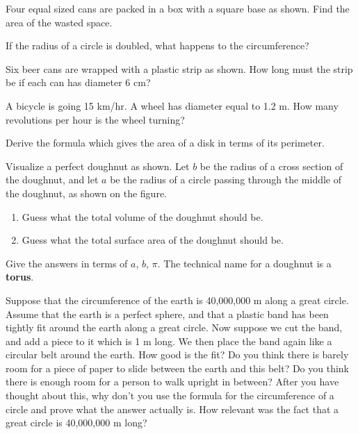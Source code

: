 \documentclass[12pt]{book} %
\begin{document}
\setcounter{Exercise}{7}
\begin{ExerciseList}
\Exercise Four equal sized cans are packed in a box with a square base as shown. Find the area of the wasted space.


\Exercise If the radius of a circle is doubled, what happens to the circumference?

\Exercise Six beer cans are wrapped with a plastic strip as shown. How long must the strip be if each can has diameter 6 cm?


\Exercise A bicycle is going 15 km/hr. A wheel has diameter equal to 1.2 m. How many revolutions per hour is the wheel turning?

\Exercise Derive the formula which gives the area of a disk in terms of its perimeter.

\Exercise Visualize a perfect doughnut as shown. Let $b$ be the radius of a cross section of the doughnut, and let $a$ be the radius of a circle passing through the middle of the doughnut, as shown on the figure.


\begin{enumerate}
\item[(a)] Guess what the total volume of the doughnut should be.
\item[(b)] Guess what the total surface area of the doughnut should be.
\end{enumerate}

Give the answers in terms of $a$, $b$, $\pi$. The technical name for a doughnut is a \textbf{torus}.

\Exercise Suppose that the circumference of the earth is 40,000,000 m along a great circle. Assume that the earth is a perfect sphere, and that a plastic band has been tightly fit around the earth along a great circle. Now suppose we cut the band, and add a piece to it which is 1 m long. We then place the band again like a circular belt around the earth. How good is the fit? Do you think there is barely room for a piece of paper to slide between the earth and this belt? Do you think there is enough room for a person to walk upright in between? After you have thought about this, why don't you use the formula for the circumference of a circle and prove what the answer actually is. How relevant was the fact that a great circle is 40,000,000 m long?
\end{ExerciseList}
\end{document}
